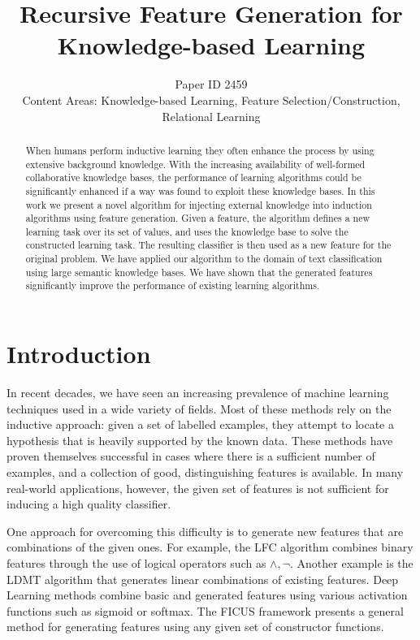 \documentclass{article}
\title{Recursive Feature Generation for Knowledge-based Learning}
\author{Paper ID 2459 \\
		Content Areas: Knowledge-based Learning, Feature Selection/Construction, Relational Learning
	}
\theoremstyle{definition}
\begin{document}
	
\maketitle
	
\begin{abstract}
	When humans perform inductive learning they often enhance the process by using extensive background knowledge.
	With the increasing availability of well-formed collaborative knowledge bases, the performance of learning algorithms could
	 be significantly enhanced if a way was found to exploit these knowledge bases. 
	In this work we present a novel algorithm for injecting external knowledge into induction algorithms using feature generation. Given a feature, the algorithm defines a new learning task over its set of values, and uses the knowledge base to solve the constructed learning task. The resulting classifier is then used as a new feature for the original problem.
	We have applied our algorithm to the domain of text classification using large semantic knowledge bases. We have shown that the generated features significantly improve the performance of existing learning algorithms.
\end{abstract}

\section{Introduction}
\label{sec:Intro}
In recent decades, we have seen an increasing prevalence of machine learning techniques used in a wide variety of fields. %
Most of these methods rely on the inductive approach: given a set of labelled examples, they attempt to locate a hypothesis that is heavily supported by the known data. These methods have proven themselves successful in cases where there is a sufficient number of examples, and a collection of good,
distinguishing features is available.
In many real-world applications, however, the given set of features is not sufficient for inducing a high quality classifier.

One approach for overcoming this difficulty is to generate new features that are combinations of the given ones.
For example, the LFC algorithm \citep{ragavan1993complex} combines binary features through the use of logical operators such as $\land ,\lnot$.
Another example is the LDMT algorithm \citep{utgo1991linear} that generates linear combinations of existing features.
Deep Learning methods combine basic and generated features using various activation functions such as sigmoid or softmax.
The FICUS framework \citep{markovitch2002feature} presents a general method for generating features using any given set of constructor functions.
\end{document}
